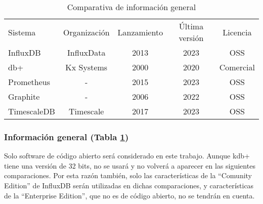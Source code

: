 \begin{table}[H]
    \begin{center}
        \begin{adjustbox}{max width=\textwidth}
            \begin{tabular}{l c c c c}
                \toprule
                Sistema & Organización & Lanzamiento & Última versión & Licencia \\
                \otoprule
                InfluxDB    & InfluxData & 2013 & 2023 & OSS \\
                db+        & Kx Systems & 2000 & 2020 & Comercial \\
                Prometheus  & -          & 2015 & 2023 & OSS \\
                Graphite    & -          & 2006 & 2022 & OSS \\
                TimescaleDB & Timescale  & 2017 & 2023 & OSS \\
                \bottomrule
            \end{tabular}
        \end{adjustbox}
        \caption{Comparativa de información general}
        \label{tabla:gisgbd}
    \end{center}
\end{table}

\subsubsection{Información general (Tabla \ref{tabla:gisgbd})} Solo software de código abierto será considerado en este
trabajo. Aunque kdb+ tiene una versión de 32 bits, no se usará y no volverá a aparecer en las siguientes comparaciones.
Por esta razón también, solo las características de la ``Comunity Edition'' de InfluxDB serán utilizadas en dichas
comparaciones, y características de la ``Enterprise Edition'', que no es de código abierto, no se tendrán en cuenta.

